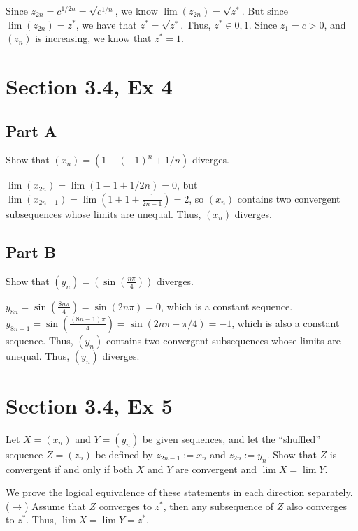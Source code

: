 \documentclass[paper=a4, fontsize=11pt]{scrartcl} %
\numberwithin{equation}{section} %
\numberwithin{figure}{section} %
\numberwithin{table}{section} %
\begin{document}
Since $z_{2n} = c^{1/2n} = \sqrt{c^{1/n}}$, we know $\lim(z_{2n}) = \sqrt{z^*}$. But since $\lim(z_{2n}) = z^*$,  we have that $z^* = \sqrt{z^*}$. Thus, $z^* \in {0,1}$. Since $z_1 = c > 0$, and $(z_n)$ is increasing, we know that $z^* = 1$. \done

\section*{Section 3.4, Ex 4}

\subsection*{Part A}

Show that $(x_n) = (1 - (-1)^n + 1/n)$ diverges.

\pf $\lim(x_{2n}) = \lim(1 - 1 + 1/2n) = 0$, but $\lim(x_{2n - 1}) = \lim(1 + 1 + \frac{1}{2n - 1}) = 2$, so $(x_n)$ contains two convergent subsequences whose limits are unequal. Thus, $(x_n)$ diverges. \done

\subsection*{Part B}

Show that $(y_n) = (\sin(\frac{n\pi}{4}))$ diverges.

\pf $y_{8n} = \sin(\frac{8n\pi}{4}) = \sin(2n\pi) = 0$, which is a constant sequence. $y_{8n-1} = \sin(\frac{(8n - 1)\pi}{4}) = \sin(2n\pi - \pi/4) = -1$, which is also a constant sequence. Thus, $(y_n)$ contains two convergent subsequences whose limits are unequal. Thus, $(y_n)$ diverges. \done

\section*{Section 3.4, Ex 5}

Let $X = (x_n)$ and $Y = (y_n)$ be given sequences, and let the ``shuffled'' sequence $Z = (z_n)$ be defined by $z_{2n - 1} := x_n$ and $z_{2n} := y_n$. Show that $Z$ is convergent if and only if both $X$ and $Y$ are convergent and $\lim X = \lim Y$.

\pf We prove the logical equivalence of these statements in each direction separately.\\

($\rightarrow$) Assume that $Z$ converges to $z^*$, then any subsequence of $Z$ also converges to $z^*$. Thus, $\lim X = \lim Y = z^*$.\\
\end{document}

